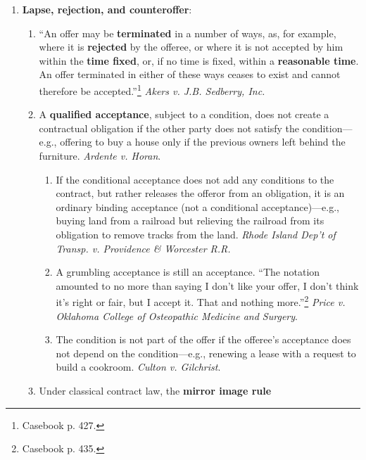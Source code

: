 \begin{enumerate}
\begin{enumerate}
        \item People are not legally bound when they make appointments or 
        reservations.\footnote{Casebook p. 424.}
    \end{enumerate}
    \item \textbf{Lapse, rejection, and counteroffer}:
    \begin{enumerate}
        \item ``An offer may be \textbf{terminated} in a number of ways, as, 
        for example, where it is \textbf{rejected} by the offeree, or where it 
        is not accepted by him within the \textbf{time fixed}, or, if no time 
        is fixed, within a \textbf{reasonable time}.  An offer terminated in 
        either of these ways ceases to exist and cannot therefore be 
        accepted.''\footnote{Casebook p. 427.} \emph{Akers v. J.B. Sedberry, 
        Inc.}
        \item A \textbf{qualified acceptance}, subject to a condition, does 
        not create a contractual obligation if the other party does not 
        satisfy the condition---e.g., offering to buy a house only if the 
        previous owners left behind the furniture. \emph{Ardente v. Horan}.
        \begin{enumerate}
            \item If the conditional acceptance does not add any conditions to 
            the contract, but rather releases the offeror from an obligation, 
            it is an ordinary binding acceptance (not a conditional 
            acceptance)---e.g., buying land from a railroad but relieving the 
            railroad from its obligation to remove tracks from the land. 
            \emph{Rhode Island Dep't of Transp. v.  Providence \& Worcester 
            R.R.}
            \item A grumbling acceptance is still an acceptance. ``The 
            notation amounted to no more than saying I don't like your offer, 
            I don't think it's right or fair, but I accept it. That and 
            nothing more.''\footnote{Casebook p. 435.} \emph{Price v. Oklahoma 
            College of Osteopathic Medicine and Surgery}.
            \item The condition is not part of the offer if the offeree's 
            acceptance does not depend on the condition---e.g., renewing a 
            lease with a request to build a cookroom. \emph{Culton v. 
            Gilchrist}.
        \end{enumerate}
        \item Under classical contract law, the \textbf{mirror image rule} 

\end{enumerate}
\end{enumerate}
